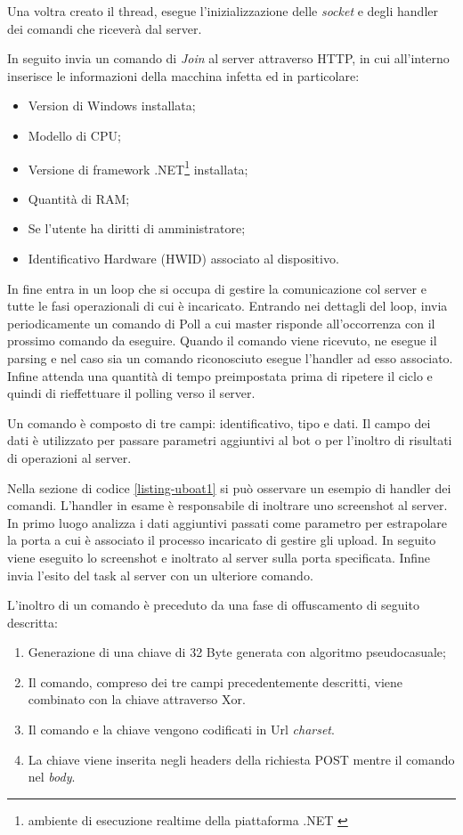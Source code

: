 Una  voltra creato il thread, esegue l'inizializzazione delle \textit{socket} e degli handler dei comandi che riceverà dal server.

In seguito invia un comando di \textit{Join} al server attraverso HTTP, in cui all'interno inserisce le informazioni della macchina infetta ed in particolare:
\begin{itemize}
    \item Version di Windows installata;
    \item Modello di CPU;
    \item Versione di framework .NET\footnote{ambiente di esecuzione realtime della piattaforma .NET \cite{netframework}} installata;
    \item Quantità di RAM;
    \item Se l'utente ha diritti di amministratore;
    \item Identificativo Hardware (HWID) associato al dispositivo.
\end{itemize}
In fine entra in un loop che si occupa di gestire la comunicazione col server e tutte le fasi operazionali di cui è incaricato.
Entrando nei dettagli del loop, invia periodicamente un comando di Poll  a cui master risponde all'occorrenza con il prossimo comando da eseguire. Quando il comando viene ricevuto, ne esegue il parsing e nel caso sia un comando riconosciuto esegue l'handler ad esso associato. Infine attenda una quantità di tempo preimpostata prima di ripetere il ciclo e quindi di rieffettuare il polling verso il server.

\medskip
Un comando è composto di tre campi: identificativo, tipo e dati.
Il campo dei dati è utilizzato per passare parametri aggiuntivi al bot o per l'inoltro di risultati di operazioni al server.

Nella sezione di codice \ref{listing-uboat1} si può osservare un esempio di handler dei comandi. L'handler in esame è  responsabile di inoltrare uno screenshot al server.  In primo luogo analizza i dati aggiuntivi passati come parametro per estrapolare la porta a cui è associato il processo incaricato di gestire gli upload. In seguito viene eseguito lo screenshot e inoltrato al server sulla porta specificata. Infine invia l'esito del task al server con un ulteriore comando.





\medskip

L'inoltro di un comando è preceduto da una fase di offuscamento di seguito descritta: 
\begin{enumerate}
    \item Generazione di una chiave di 32 Byte generata con algoritmo pseudocasuale;
    \item Il comando, compreso dei tre campi precedentemente descritti, viene combinato con la chiave attraverso Xor.
    \item Il comando e la chiave vengono codificati in Url \textit{charset}.
    \item La chiave viene inserita negli headers della richiesta POST mentre il comando nel \textit{body}.
\end{enumerate}

